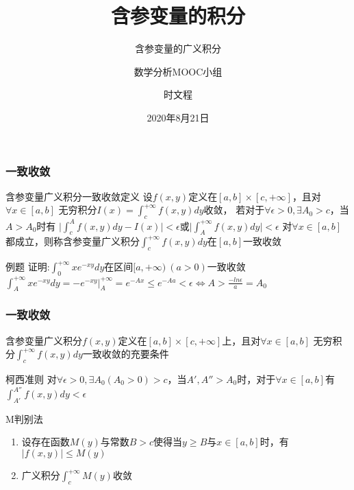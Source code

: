 \documentclass[xetex]{beamer}
\title{含参变量的积分}
\subtitle{含参变量的广义积分}
\author{数学分析MOOC小组 \and 时文程}
\date{2020年8月21日}
\begin{document}
\frame{\maketitle}

\begin{frame}
    \frametitle{一致收敛}
    \begin{block}{含参变量广义积分一致收敛定义}
        设$f(x,y)$定义在$[a,b]\times[c,+\infty]$，且对$\forall x\in[a,b]$
        无穷积分$I(x)=\int_{c}^{+\infty}{f(x,y)dy}$收敛，
        若对于$\forall \epsilon > 0, \exists A_0 > c$，当$A>A_0$时有
        $\vert \int_c^A{f(x,y)dy}-I(x)\vert < \epsilon$或$\vert \int_A^{+\infty}{f(x,y)dy}\vert < \epsilon$
        对$\forall x \in [a,b]$都成立，则称含参变量广义积分$\int_c^{+\infty}{f(x,y)dy}$在$[a,b]$一致收敛
    \end{block}

    \begin{block}{例题}
        证明:$\int_{0}^{+\infty}{xe^{-xy}dy}$在区间$[a,+\infty)\ (a>0)$一致收敛
        $\int_{A}^{+\infty}{xe^{-xy}dy}=-e^{-xy}|^{+\infty}_{A}=e^{-Ax}\le e^{-Aa}<\epsilon \Leftrightarrow A > \frac{-ln{\epsilon}}{a} = A_0$
    \end{block}


\end{frame}

\begin{frame}
    \frametitle{一致收敛}
    含参变量广义积分$f(x,y)$定义在$[a,b]\times[c,+\infty]$上，且对$\forall x\in[a,b]$
    无穷积分$\int_{c}^{+\infty}{f(x,y)dy}$一致收敛的充要条件
    \begin{block}{柯西准则}
        对$\forall \epsilon>0,\exists A_0(A_0>0)>c$，当$A',A''>A_0$时，对于$\forall x \in [a,b]$有
        $\int_{A'}^{A''}{f(x,y)dy}<\epsilon$
    \end{block}
    \begin{block}{M判别法}
    \begin{enumerate}
        \item 设存在函数$M(y)$与常数$B>c$使得当$y\ge B$与$x\in [a,b]$时，有$\vert f(x,y)\vert\le M(y)$
        \item 广义积分$\int_{c}^{+\infty}{M(y)}$收敛
    \end{enumerate}
    \end{block}

\end{frame}
\end{document}
